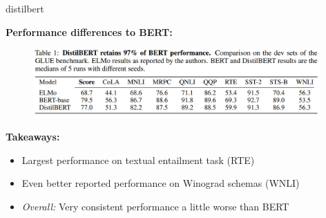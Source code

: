
\begin{frame}{distilbert}

\vfill

	\textbf{Performance differences to BERT:}

	\begin{figure}
		\centering
		\includegraphics[width = 11cm]{figure/distilbert-vs-sota.png}\\ 
	\end{figure}


\textbf{Takeaways:}

\begin{itemize}
	\item Largest performance on textual entailment task (RTE)
	\item Even better reported performance on Winograd schemas (WNLI)
	\item \textit{Overall:} Very consistent performance a little worse than BERT
\end{itemize}

\vfill

\end{frame}


